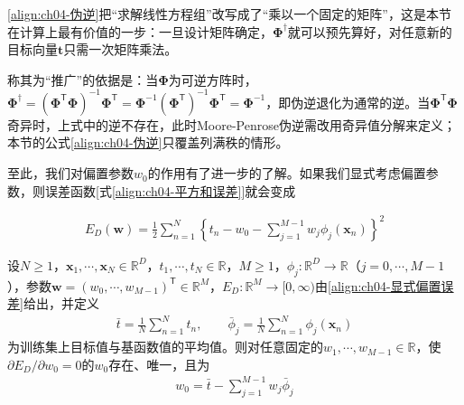 \documentclass[../../main.tex]{subfiles}
\begin{document}
\begin{remark}
\eqref{align:ch04-伪逆}把“求解线性方程组”改写成了“乘以一个固定的矩阵”，这是本节在计算上最有价值的一步：一旦设计矩阵确定，$\boldsymbol{\Phi}^{\dagger}$就可以预先算好，对任意新的目标向量$\boldsymbol{t}$只需一次矩阵乘法。

称其为“推广”的依据是：当$\boldsymbol{\Phi}$为可逆方阵时，$\boldsymbol{\Phi}^{\dagger}=(\boldsymbol{\Phi}^{\mathsf{T}}\boldsymbol{\Phi})^{-1}\boldsymbol{\Phi}^{\mathsf{T}}=\boldsymbol{\Phi}^{-1}(\boldsymbol{\Phi}^{\mathsf{T}})^{-1}\boldsymbol{\Phi}^{\mathsf{T}}=\boldsymbol{\Phi}^{-1}$，即伪逆退化为通常的逆。当$\boldsymbol{\Phi}^{\mathsf{T}}\boldsymbol{\Phi}$奇异时，上式中的逆不存在，此时Moore-Penrose伪逆需改用奇异值分解来定义；本节的公式\eqref{align:ch04-伪逆}只覆盖列满秩的情形。
\end{remark}

至此，我们对偏置参数$w_0$的作用有了进一步的了解。如果我们显式考虑偏置参数，则误差函数[式\eqref{align:ch04-平方和误差}]就会变成

\begin{align}
  E_D(\boldsymbol{w})=\frac{1}{2}\sum_{n=1}^{N}\left\{t_n-w_0-\sum_{j=1}^{M-1}w_j\phi_j(\boldsymbol{x}_n)\right\}^2
  \label{align:ch04-显式偏置误差}
\end{align}

\begin{proposition}[偏置参数的显式解]\label{proposition:ch04-偏置解}
设$N\geqslant1$，$\boldsymbol{x}_1,\cdots,\boldsymbol{x}_N\in\mathbb{R}^{D}$，$t_1,\cdots,t_N\in\mathbb{R}$，$M\geqslant1$，$\phi_j:\mathbb{R}^{D}\to\mathbb{R}$（$j=0,\cdots,M-1$），参数$\boldsymbol{w}=(w_0,\cdots,w_{M-1})^{\mathsf{T}}\in\mathbb{R}^{M}$，$E_D:\mathbb{R}^{M}\to[0,\infty)$由\eqref{align:ch04-显式偏置误差}给出，并定义
\begin{align}
  \bar{t}=\frac{1}{N}\sum_{n=1}^{N}t_n,\qquad
  \bar{\phi}_j=\frac{1}{N}\sum_{n=1}^{N}\phi_j(\boldsymbol{x}_n)
  \label{align:ch04-均值定义}
\end{align}
为训练集上目标值与基函数值的平均值。则对任意固定的$w_1,\cdots,w_{M-1}\in\mathbb{R}$，使$\partial E_D/\partial w_0=0$的$w_0$存在、唯一，且为
\begin{align}
  w_0=\bar{t}-\sum_{j=1}^{M-1}w_j\bar{\phi}_j
  \label{align:ch04-偏置解}
\end{align}
\end{proposition}
\end{document}
